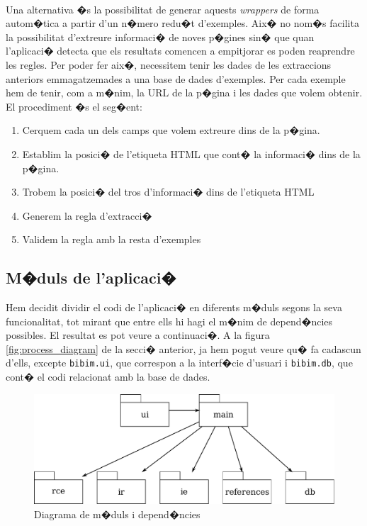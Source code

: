 \documentclass[a4paper,oneside]{article}
\begin{document}
\paragraph{}
Una alternativa �s la possibilitat de generar aquests \textit{wrappers} de forma autom�tica a partir d'un n�mero redu�t d'exemples. Aix� no nom�s facilita la possibilitat d'extreure informaci� de noves p�gines sin� que quan l'aplicaci� detecta que els resultats comencen a empitjorar es poden reaprendre les regles. Per poder fer aix�, necessitem tenir les dades de les extraccions anteriors emmagatzemades a una base de dades d'exemples. Per cada exemple hem de tenir, com a m�nim, la URL de la p�gina i les dades que volem obtenir. El procediment �s el seg�ent:
\begin{enumerate}
    \item{Cerquem cada un dels camps que volem extreure dins de la p�gina.}
    \item{Establim la posici� de l'etiqueta HTML que cont� la informaci� dins de la p�gina.}
    \item{Trobem la posici� del tros d'informaci� dins de l'etiqueta HTML}
    \item{Generem la regla d'extracci�}
    \item{Validem la regla amb la resta d'exemples}
\end{enumerate}

\subsection{M�duls de l'aplicaci�}
Hem decidit dividir el codi de l'aplicaci� en diferents m�duls segons la seva funcionalitat, tot mirant que entre ells hi hagi el m�nim de depend�ncies possibles. El resultat es pot veure a continuaci�. A la figura \ref{fig:process_diagram} de la secci� anterior, ja hem pogut veure qu� fa cadascun d'ells, excepte \texttt{bibim.ui}, que correspon a la interf�cie d'usuari i \texttt{bibim.db}, que cont� el codi relacionat amb la base de dades.

\begin{figure}[H]
\begin{center}
\includegraphics[scale=0.4]{images/module_diagram.pdf}
\caption{Diagrama de m�duls i depend�ncies}
\label{fig:module_diagram}
\end{center}
\end{figure}
\end{document}
